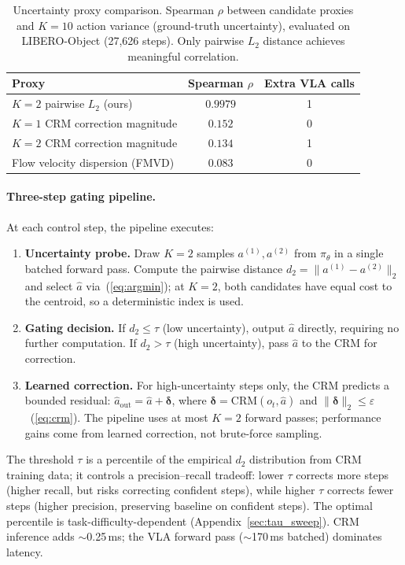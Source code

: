\begin{table}[t]
\centering
\caption{Uncertainty proxy comparison. Spearman $\rho$ between candidate proxies and $K{=}10$ action variance (ground-truth uncertainty), evaluated on LIBERO-Object (27{,}626 steps). Only pairwise $L_2$ distance achieves meaningful correlation.}
\label{tab:proxy_comparison}
\small
\begin{tabular}{lcc}
\toprule
Proxy & Spearman $\rho$ & Extra VLA calls \\
\midrule
$K{=}2$ pairwise $L_2$ (ours) & $\mathbf{0.9979}$ & 1 \\
$K{=}1$ CRM correction magnitude & $0.152$ & 0 \\
$K{=}2$ CRM correction magnitude & $0.134$ & 1 \\
Flow velocity dispersion (FMVD) & $0.083$ & 0 \\
\bottomrule
\end{tabular}
\end{table}

\paragraph{Three-step gating pipeline.}
At each control step, the pipeline executes:
\begin{enumerate}[nosep,leftmargin=*]
  \item \textbf{Uncertainty probe.} Draw $K{=}2$ samples $a^{(1)}, a^{(2)}$ from $\pi_\theta$ in a single batched forward pass. Compute the pairwise distance $d_2 = \|a^{(1)} - a^{(2)}\|_2$ and select $\hat{a}$ via~(\ref{eq:argmin}); at $K{=}2$, both candidates have equal cost to the centroid, so a deterministic index is used.
  \item \textbf{Gating decision.} If $d_2 \leq \tau$ (low uncertainty), output $\hat{a}$ directly, requiring no further computation. If $d_2 > \tau$ (high uncertainty), pass $\hat{a}$ to the CRM for correction.
  \item \textbf{Learned correction.} For high-uncertainty steps only, the CRM predicts a bounded residual: $\hat{a}_{\mathrm{out}} = \hat{a} + \boldsymbol{\delta}$, where $\boldsymbol{\delta} = \mathrm{CRM}(o_t, \hat{a})$ and $\|\boldsymbol{\delta}\|_2 \leq \varepsilon$~(\ref{eq:crm}). The pipeline uses at most $K{=}2$ forward passes; performance gains come from learned correction, not brute-force sampling.
\end{enumerate}
The threshold $\tau$ is a percentile of the empirical $d_2$ distribution from CRM training data; it controls a precision--recall tradeoff: lower $\tau$ corrects more steps (higher recall, but risks correcting confident steps), while higher $\tau$ corrects fewer steps (higher precision, preserving baseline on confident steps). The optimal percentile is task-difficulty-dependent (Appendix~\ref{sec:tau_sweep}). CRM inference adds ${\sim}$0.25\,ms; the VLA forward pass (${\sim}$170\,ms batched) dominates latency.
